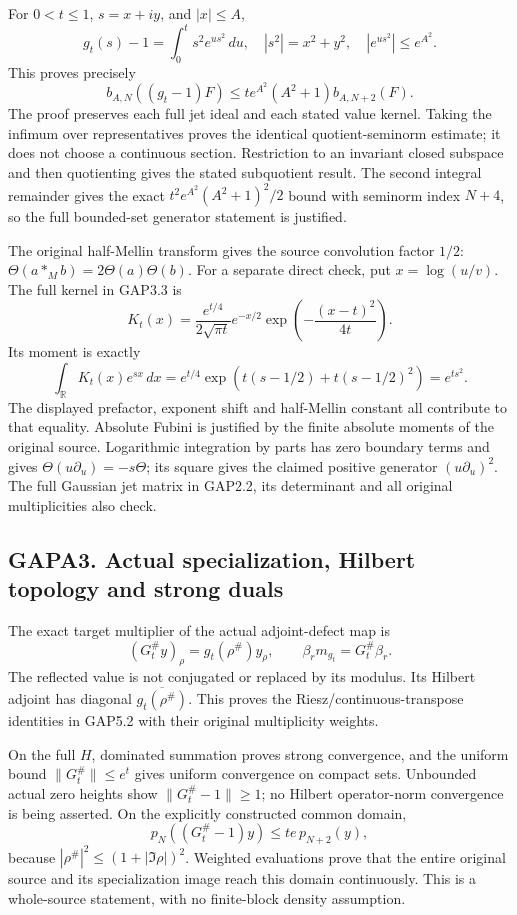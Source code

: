For \(0<t\le1\), \(s=x+iy\), and \(|x|\le A\), \[
g_t(s)-1=\int_0^t s^2e^{us^2}\,du,
\quad |s^2|=x^2+y^2,
\quad |e^{us^2}|\le e^{A^2}.
\] This proves precisely \[
b_{A,N}((g_t-1)F)
\le te^{A^2}(A^2+1)b_{A,N+2}(F).
\tag{GAPA2.1}
\] The proof preserves each full jet ideal and each stated value kernel.
Taking the infimum over representatives proves the identical
quotient-seminorm estimate; it does not choose a continuous section.
Restriction to an invariant closed subspace and then quotienting gives
the stated subquotient result. The second integral remainder gives the
exact \(t^2e^{A^2}(A^2+1)^2/2\) bound with seminorm index \(N+4\), so
the full bounded-set generator statement is justified.

The original half-Mellin transform gives the source convolution factor
\(1/2\): \(\Theta(a*_Mb)=2\Theta(a)\Theta(b)\). For a separate direct
check, put \(x=\log(u/v)\). The full kernel in GAP3.3 is \[
K_t(x)=\frac{e^{t/4}}{2\sqrt{\pi t}}
e^{-x/2}\exp\!\left(-\frac{(x-t)^2}{4t}\right).
\] Its moment is exactly \[
\int_{\mathbb R}K_t(x)e^{sx}\,dx
=e^{t/4}\exp\!\left(t(s-1/2)+t(s-1/2)^2\right)
=e^{ts^2}.
\tag{GAPA2.2}
\] The displayed prefactor, exponent shift and half-Mellin constant all
contribute to that equality. Absolute Fubini is justified by the finite
absolute moments of the original source. Logarithmic integration by
parts has zero boundary terms and gives
\(\Theta(u\partial_u)=-s\Theta\); its square gives the claimed positive
generator \((u\partial_u)^2\). The full Gaussian jet matrix in GAP2.2,
its determinant and all original multiplicities also check.

\subsection{GAPA3. Actual specialization, Hilbert topology and strong
duals}\label{gapa3.-actual-specialization-hilbert-topology-and-strong-duals}

The exact target multiplier of the actual adjoint-defect map is \[
(G_t^\#y)_\rho=g_t(\rho^\#)y_\rho,
\qquad \beta_rm_{g_t}=G_t^\#\beta_r.
\tag{GAPA3.1}
\] The reflected value is not conjugated or replaced by its modulus. Its
Hilbert adjoint has diagonal \(\overline{g_t(\rho^\#)}\). This proves
the Riesz/continuous-transpose identities in GAP5.2 with their original
multiplicity weights.

On the full \(H\), dominated summation proves strong convergence, and
the uniform bound \(\|G_t^\#\|\le e^t\) gives uniform convergence on
compact sets. Unbounded actual zero heights show \(\|G_t^\#-1\|\ge1\);
no Hilbert operator-norm convergence is being asserted. On the
explicitly constructed common domain, \[
p_N((G_t^\#-1)y)\le te\,p_{N+2}(y),
\tag{GAPA3.2}
\] because \(|\rho^\#|^2\le(1+|\Im\rho|)^2\). Weighted evaluations prove
that the entire original source and its specialization image reach this
domain continuously. This is a whole-source statement, with no
finite-block density assumption.

